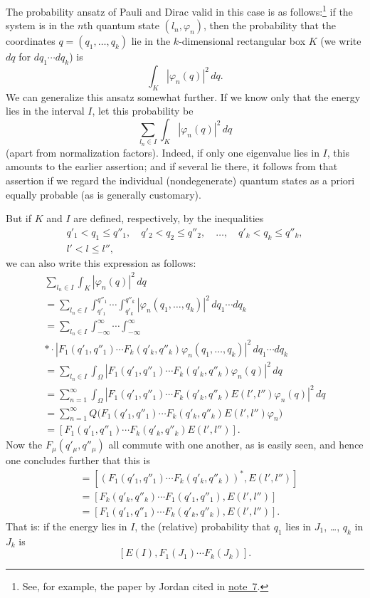 \documentclass[fontsize=13pt,paper=b5,twoside,bookmarkpackage=false]{scrartcl}
\newcommand{\fnref}[1]{\hyperref[fn:#1]{note~#1}}
\begin{document}
The probability ansatz of Pauli and Dirac valid in this case is as follows:\footnote[34]{\label{fn:34}See, for example, the paper by Jordan cited in \fnref{7}.} if the system is in the $n$th quantum state $(l_n,\varphi_n)$, then the probability that the coordinates $q=(q_1,\ldots,q_k)$ lie in the $k$-dimensional rectangular box $K$ (we write $dq$ for $dq_1\cdots dq_k$) is
\[
 \int_K|\varphi_n(q)|^2\,dq.
\]
We can generalize this ansatz somewhat further. If we know only that the energy lies in the interval $I$, let this probability be
\[
 \sum_{l_n\in I}\int_K|\varphi_n(q)|^2\,dq
\]
(apart from normalization factors). Indeed, if only one eigenvalue lies in $I$, this amounts to the earlier assertion; and if several lie there, it follows from that assertion if we regard the individual (nondegenerate) quantum states as a priori equally probable (as is generally customary).

But if $K$ and $I$ are defined, respectively, by the inequalities
\begin{gather*}
 q'_1<q_1\leq q''_1,\quad q'_2<q_2\leq q''_2,\quad\ldots,\quad
 q'_k<q_k\leq q''_k,\\
 l'<l\leq l'',
\end{gather*}
we can also write this expression as follows:
\begin{gather*}
 \sum_{l_n\in I}\int_K|\varphi_n(q)|^2\,dq
 \\
 =\sum_{l_n\in I}\int_{q'_1}^{q''_1}\cdots\int_{q'_k}^{q''_k}
 |\varphi_n(q_1,\ldots,q_k)|^2\,dq_1\cdots dq_k\\
 =\sum_{l_n\in I}\int_{-\infty}^{\infty}\cdots\int_{-\infty}^{\infty}\\*
 {}\cdot |F_1(q'_1,q''_1)\cdots F_k(q'_k,q''_k)\varphi_n(q_1,\ldots,q_k)|^2
 \,dq_1\cdots dq_k\\
 =\sum_{l_n\in I}\int_\Omega
 |F_1(q'_1,q''_1)\cdots F_k(q'_k,q''_k)\varphi_n(q)|^2\,dq\\
 =\sum_{n=1}^{\infty}\int_\Omega
 |F_1(q'_1,q''_1)\cdots F_k(q'_k,q''_k)E(l',l'')\varphi_n(q)|^2\,dq\\
 =\sum_{n=1}^{\infty}Q\bigl(
 F_1(q'_1,q''_1)\cdots F_k(q'_k,q''_k)E(l',l'')\varphi_n\bigr)\\
 =[F_1(q'_1,q''_1)\cdots F_k(q'_k,q''_k)E(l',l'')].
\end{gather*}
Now the $F_\mu(q'_\mu,q''_\mu)$ all commute with one another, as is easily seen, and hence one concludes further that this is
\begin{align*}
 &=[(F_1(q'_1,q''_1)\cdots F_k(q'_k,q''_k))^*,E(l',l'')]\\
 &=[F_k(q'_k,q''_k)\cdots F_1(q'_1,q''_1),E(l',l'')]\\
 &=[F_1(q'_1,q''_1)\cdots F_k(q'_k,q''_k),E(l',l'')].
\end{align*}
That is: if the energy lies in $I$, the (relative) probability that $q_1$ lies in $J_1$, \ldots, $q_k$ in $J_k$ is
\label{eq:XII:relative-probability}
\[
 [E(I),F_1(J_1)\cdots F_k(J_k)].
\]
\end{document}
